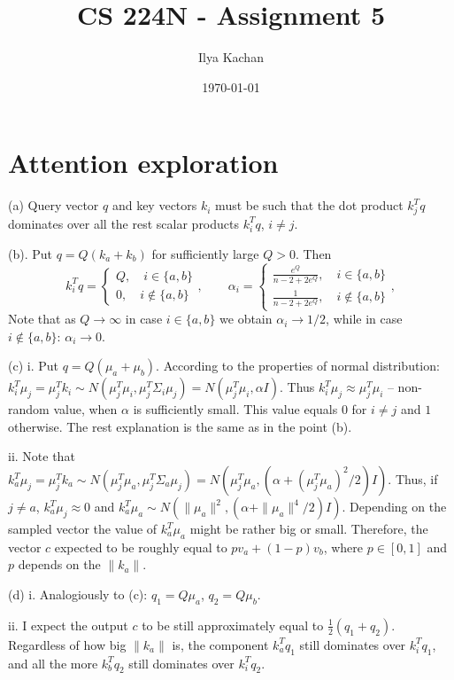 \documentclass[12pt]{article}
\title{CS 224N - Assignment 5}
\author{Ilya Kachan}
\date{\today}
\begin{document}
\maketitle

\section{Attention exploration}

\noindent (a) Query vector $q$ and key vectors $k_i$ must be such that the dot product $k_j^T q$ dominates over all the rest scalar products $k_i^T q$, $i \ne j$.
\smallskip

\noindent (b). Put $q = Q(k_a + k_b)$ for sufficiently large $Q > 0$. Then
$$
k_i^T q = \left\{
\begin{array}{l}
Q,\quad i \in \{a, b\} \\
0, \quad i \not\in \{a, b\}
\end{array}
\right.,
\qquad
\alpha_i = \left\{
\begin{array}{l}
\frac{e^Q}{n-2 + 2e^Q},\quad i \in \{a, b\} \\
\frac{1}{n-2 + 2e^Q}, \quad i \not\in \{a, b\}
\end{array}
\right.,
$$
Note that as $Q\to\infty$ in case $i \in \{a, b\}$ we obtain $\alpha_i \to 1/2$, while in case $i \not\in \{a, b\}$: $\alpha_i \to 0$.
\smallskip

\noindent (c) i. Put $q = Q(\mu_a + \mu_b)$. According to the properties of normal distribution: $k_i^T \mu_j = \mu_j^T k_i \sim N(\mu_j^T \mu_i, \mu_j^T \Sigma_i \mu_j) = N(\mu_j^T \mu_i, \alpha I)$. Thus $k_i^T \mu_j \approx \mu_j^T \mu_i$ -- non-random value, when $\alpha$ is sufficiently small. This value equals $0$ for $i\ne j$ and $1$ otherwise. The rest explanation is the same as in the point (b).

ii. Note that $k_a^T \mu_j = \mu_j^T k_a \sim N(\mu_j^T \mu_a, \mu_j^T \Sigma_a \mu_j) = N(\mu_j^T \mu_a, (\alpha + (\mu_j^T\mu_a)^2/2) I)$. Thus, if $j \ne a$, $k_a^T \mu_j \approx 0$ and $k_a^T \mu_a \sim N(\|\mu_a\|^2, (\alpha + \|\mu_a\|^4/2) I)$. Depending on the sampled vector the value of $k_a^T \mu_a$ might be rather big or small. Therefore, the vector $c$ expected to be roughly equal to $p v_a + (1-p) v_b$, where $p\in[0,1]$ and $p$ depends on the $\|k_a\|$.
\smallskip

\noindent (d) i. Analogiously to (c): $q_1 = Q\mu_a$, $q_2 = Q\mu_b$.

ii. I expect the output $c$ to be still approximately equal to $\frac{1}{2}(q_1 + q_2)$. Regardless of how big $\|k_a\|$ is, the component $k_a^T q_1$ still dominates over $k_i^T q_1$, and all the more $k_b^T q_2$ still dominates over $k_i^T q_2$.
\smallskip
\end{document}

